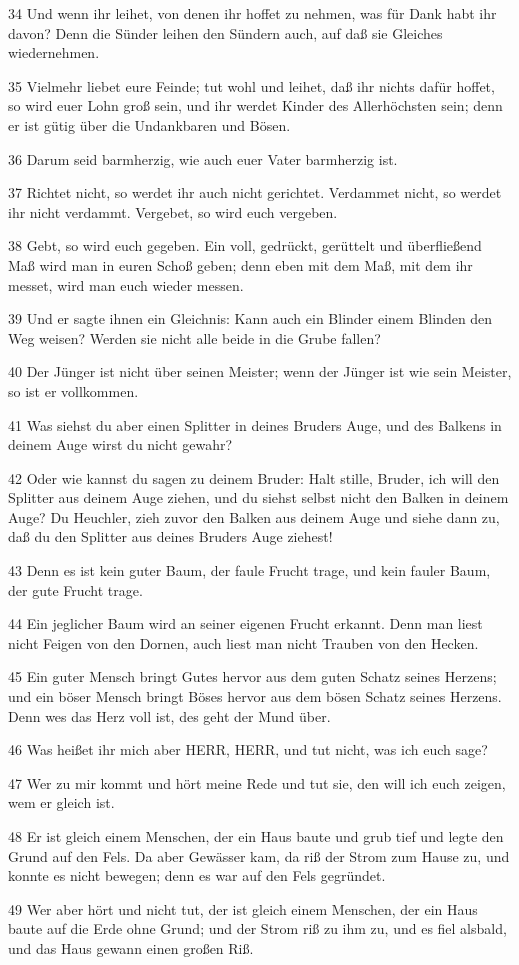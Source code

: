 \par 34 Und wenn ihr leihet, von denen ihr hoffet zu nehmen, was für Dank habt ihr davon? Denn die Sünder leihen den Sündern auch, auf daß sie Gleiches wiedernehmen.
\par 35 Vielmehr liebet eure Feinde; tut wohl und leihet, daß ihr nichts dafür hoffet, so wird euer Lohn groß sein, und ihr werdet Kinder des Allerhöchsten sein; denn er ist gütig über die Undankbaren und Bösen.
\par 36 Darum seid barmherzig, wie auch euer Vater barmherzig ist.
\par 37 Richtet nicht, so werdet ihr auch nicht gerichtet. Verdammet nicht, so werdet ihr nicht verdammt. Vergebet, so wird euch vergeben.
\par 38 Gebt, so wird euch gegeben. Ein voll, gedrückt, gerüttelt und überfließend Maß wird man in euren Schoß geben; denn eben mit dem Maß, mit dem ihr messet, wird man euch wieder messen.
\par 39 Und er sagte ihnen ein Gleichnis: Kann auch ein Blinder einem Blinden den Weg weisen? Werden sie nicht alle beide in die Grube fallen?
\par 40 Der Jünger ist nicht über seinen Meister; wenn der Jünger ist wie sein Meister, so ist er vollkommen.
\par 41 Was siehst du aber einen Splitter in deines Bruders Auge, und des Balkens in deinem Auge wirst du nicht gewahr?
\par 42 Oder wie kannst du sagen zu deinem Bruder: Halt stille, Bruder, ich will den Splitter aus deinem Auge ziehen, und du siehst selbst nicht den Balken in deinem Auge? Du Heuchler, zieh zuvor den Balken aus deinem Auge und siehe dann zu, daß du den Splitter aus deines Bruders Auge ziehest!
\par 43 Denn es ist kein guter Baum, der faule Frucht trage, und kein fauler Baum, der gute Frucht trage.
\par 44 Ein jeglicher Baum wird an seiner eigenen Frucht erkannt. Denn man liest nicht Feigen von den Dornen, auch liest man nicht Trauben von den Hecken.
\par 45 Ein guter Mensch bringt Gutes hervor aus dem guten Schatz seines Herzens; und ein böser Mensch bringt Böses hervor aus dem bösen Schatz seines Herzens. Denn wes das Herz voll ist, des geht der Mund über.
\par 46 Was heißet ihr mich aber HERR, HERR, und tut nicht, was ich euch sage?
\par 47 Wer zu mir kommt und hört meine Rede und tut sie, den will ich euch zeigen, wem er gleich ist.
\par 48 Er ist gleich einem Menschen, der ein Haus baute und grub tief und legte den Grund auf den Fels. Da aber Gewässer kam, da riß der Strom zum Hause zu, und konnte es nicht bewegen; denn es war auf den Fels gegründet.
\par 49 Wer aber hört und nicht tut, der ist gleich einem Menschen, der ein Haus baute auf die Erde ohne Grund; und der Strom riß zu ihm zu, und es fiel alsbald, und das Haus gewann einen großen Riß.

